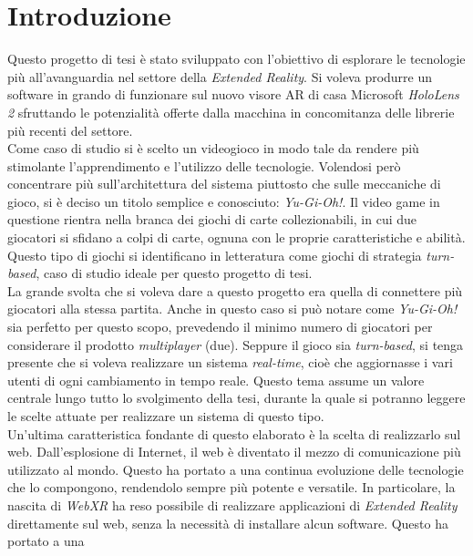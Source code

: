 \chapter{Introduzione}

Questo progetto di tesi è stato sviluppato con l'obiettivo di esplorare le tecnologie più all'avanguardia nel settore della \textit{Extended Reality}. Si voleva produrre un software
in grando di funzionare sul nuovo visore AR di casa Microsoft \textit{HoloLens 2} sfruttando le potenzialità offerte dalla macchina in concomitanza delle librerie più recenti
del settore.\\
\newline
Come caso di studio si è scelto un videogioco in modo tale da rendere più stimolante l'apprendimento e l'utilizzo delle tecnologie. Volendosi però concentrare più sull'architettura
del sistema piuttosto che sulle meccaniche di gioco, si è deciso un titolo semplice e conosciuto: \textit{Yu-Gi-Oh!}. Il video game in questione rientra nella branca dei giochi di
carte collezionabili, in cui due giocatori si sfidano a colpi di carte, ognuna con le proprie caratteristiche e abilità. Questo tipo di giochi si identificano in letteratura come
giochi di strategia \textit{turn-based}, caso di studio ideale per questo progetto di tesi.\\
\newline
La grande svolta che si voleva dare a questo progetto era quella di connettere più giocatori alla stessa partita. Anche in questo caso si può notare come \textit{Yu-Gi-Oh!} sia 
perfetto per questo scopo, prevedendo il minimo numero di giocatori per considerare il prodotto \textit{multiplayer} (due). Seppure il gioco sia \textit{turn-based}, si tenga presente
che si voleva realizzare un sistema \textit{real-time}, cioè che aggiornasse i vari utenti di ogni cambiamento in tempo reale. Questo tema assume un valore centrale lungo tutto lo
svolgimento della tesi, durante la quale si potranno leggere le scelte attuate per realizzare un sistema di questo tipo.\\
\newline
Un'ultima caratteristica fondante di questo elaborato è la scelta di realizzarlo sul web. Dall'esplosione di Internet, il web è diventato il mezzo di comunicazione più utilizzato
al mondo. Questo ha portato a una continua evoluzione delle tecnologie che lo compongono, rendendolo sempre più potente e versatile. In particolare, la nascita di \textit{WebXR} ha
reso possibile di realizzare applicazioni di \textit{Extended Reality} direttamente sul web, senza la necessità di installare alcun software. Questo ha portato a una
